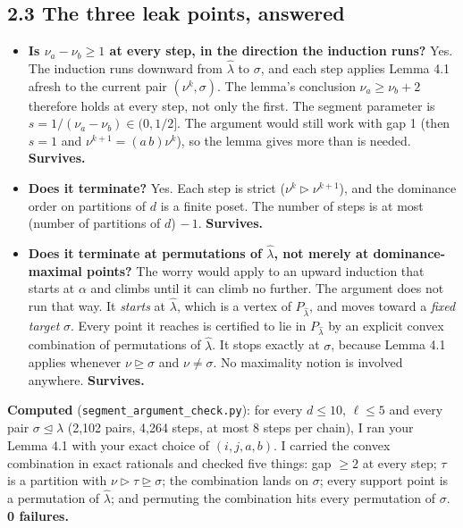 \documentclass[11pt]{amsart}
\newcommand{\lh}{\hat\lambda}
\newcommand{\dom}{\trianglelefteq}
\newcommand{\domg}{\trianglerighteq}
\newcommand{\sdomg}{\triangleright}
\begin{document}
\subsection*{2.3 The three leak points, answered}
\begin{itemize}[leftmargin=2em]
\item[(a)] \textbf{Is $\nu_a-\nu_b\ge1$ at every step, in the direction the induction runs?} Yes. The induction runs downward from $\lh$ to $\sigma$, and each step applies Lemma 4.1 afresh to the current pair $(\nu^k,\sigma)$. The lemma's conclusion $\nu_a\ge\nu_b+2$ therefore holds at every step, not only the first. The segment parameter is $s=1/(\nu_a-\nu_b)\in(0,1/2]$. The argument would still work with gap 1 (then $s=1$ and $\nu^{k+1}=(a\,b)\nu^k$), so the lemma gives more than is needed. \textbf{Survives.}
\item[(b)] \textbf{Does it terminate?} Yes. Each step is strict ($\nu^k\sdomg\nu^{k+1}$), and the dominance order on partitions of $d$ is a finite poset. The number of steps is at most (number of partitions of $d$) $-\,1$. \textbf{Survives.}
\item[(c)] \textbf{Does it terminate at permutations of $\lh$, not merely at dominance-maximal points?} The worry would apply to an upward induction that starts at $\alpha$ and climbs until it can climb no further. The argument does not run that way. It \emph{starts} at $\lh$, which is a vertex of $P_{\lh}$, and moves toward a \emph{fixed target} $\sigma$. Every point it reaches is certified to lie in $P_{\lh}$ by an explicit convex combination of permutations of $\lh$. It stops exactly at $\sigma$, because Lemma 4.1 applies whenever $\nu\domg\sigma$ and $\nu\ne\sigma$. No maximality notion is involved anywhere. \textbf{Survives.}
\end{itemize}

\noindent\textbf{Computed} (\texttt{segment\_argument\_check.py}): for every $d\le10$, $\ell\le5$ and every pair $\sigma\dom\lh$ (2{,}102 pairs, 4{,}264 steps, at most 8 steps per chain), I ran your Lemma 4.1 with your exact choice of $(i,j,a,b)$. I carried the convex combination in exact rationals and checked five things: gap $\ge2$ at every step; $\tau$ is a partition with $\nu\sdomg\tau\domg\sigma$; the combination lands on $\sigma$; every support point is a permutation of $\lh$; and permuting the combination hits every permutation of $\sigma$. \textbf{0 failures.}
\end{document}

